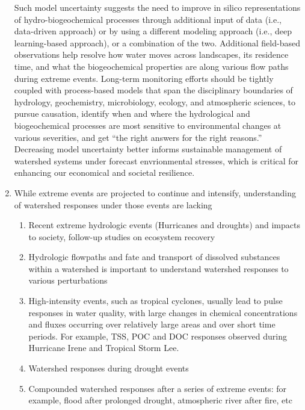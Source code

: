 \documentclass[preprint,review, 12pt]{elsarticle}
\begin{document}
\begin{enumerate}
Such model uncertainty suggests the need to improve in silico representations of hydro-biogeochemical processes through additional input of data (i.e., data-driven approach) or by using a different modeling approach (i.e., deep learning-based approach), or a combination of the two. Additional field-based observations help resolve how water moves across landscapes, its residence time, and what the biogeochemical properties are along various flow paths during extreme events. Long-term monitoring efforts should be tightly coupled with process-based models that span the disciplinary boundaries of hydrology, geochemistry, microbiology, ecology, and atmospheric sciences, to pursue causation, identify when and where the hydrological and biogeochemical processes are most sensitive to environmental changes at various severities, and get “the right answers for the right reasons.” Decreasing model uncertainty better informs sustainable management of watershed systems under forecast envrionmental stresses, which is critical for enhancing our economical and societal resilience.
\item While extreme events are projected to continue and intensify, understanding of watershed responses under those events are lacking
    \begin{enumerate}
        \item Recent extreme hydrologic events (Hurricanes and droughts) and impacts to society, follow-up studies on ecosystem recovery 
        \item Hydrologic flowpaths and fate and transport of dissolved substances within a watershed is important to understand watershed responses to various perturbations    
        \item High-intensity events, such as tropical cyclones, usually lead to pulse responses in water quality, with large changes in chemical concentrations and fluxes occurring over relatively large areas and over short time periods. For example, TSS, POC and DOC responses observed during Hurricane Irene and Tropical Storm Lee.
        \item Watershed responses during drought events
        \item Compounded watershed responses after a series of extreme events: for example, flood after prolonged drought, atmospheric river after fire, etc
    \end{enumerate}


\end{enumerate}
\end{document}
